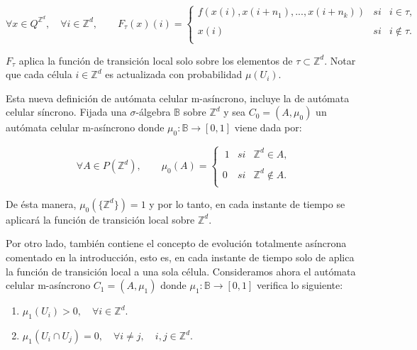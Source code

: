 \documentclass[../proyecto.tex]{memoir}
\begin{document}
\begin{equation*}
	\forall x \in Q^{\mathds{Z}^{d}}, \quad \forall i \in \mathds{Z}^{d}, \qquad
	F_{\tau}(x)(i) = \left\{ \begin{array}{lcc}
             f(x(i),x(i+n_{1}),...,x(i+n_{k})) &   si  & i \in \tau ,\\
             \\ x(i) & si  & i \notin \tau .\\
             \end{array}
             \right.
\end{equation*}

$F_{\tau}$ aplica la función de transición local solo sobre los elementos de $\tau \subset \mathds{Z}^{d}$. Notar que cada célula $i \in \mathds{Z}^{d}$ es actualizada con probabilidad $\mu(U_{i})$.

Esta nueva definición de autómata celular m-asíncrono, incluye la de autómata celular síncrono. Fijada una $\sigma$-álgebra $\mathds{B}$ sobre $\mathds{Z}^{d}$ y sea $C_{0}=(A, \mu_{0})$ un autómata celular m-asíncrono donde $\mu_{0}: \mathds{B} \rightarrow [0,1]$ viene dada por: 

\begin{equation*}
	 \forall A \in P(\mathds{Z}^{d}), \qquad 
	 \mu_{0}(A) = \left\{ \begin{array}{lcc}
             \ 1 &   si  & \mathds{Z}^{d} \in A ,\\
             \\0 &   si  & \mathds{Z}^{d} \notin A .\\
             \end{array}
             \right.
\end{equation*}

De ésta manera, $\mu_{0}(\{\mathds{Z}^{d}\})=1$ y por lo tanto, en cada instante de tiempo se aplicará la función de transición local sobre $\mathds{Z}^{d}$.

Por otro lado, también contiene el concepto de evolución totalmente asíncrona comentado en la introducción, esto es, en cada instante de tiempo solo de aplica la función de transición local a una sola célula. Consideramos ahora el autómata celular m-asíncrono $C_{1}=(A, \mu_{1})$ donde $\mu_{1}: \mathds{B} \rightarrow [0,1]$ verifica lo siguiente:

\begin{enumerate}
\item $\mu_{1}(U_{i}) > 0, \quad \forall i \in \mathds{Z}^{d}$.
\item $\mu_{1}(U_{i} \cap U_{j}) = 0, \quad \forall i \neq j, \quad i,j \in \mathds{Z}^{d}$.
\end{enumerate}
\end{document}
